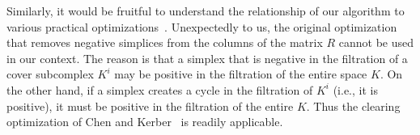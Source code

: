 Similarly, it would be fruitful to understand the relationship of our algorithm
to various practical optimizations~\cite{parallel-phat}.
Unexpectedly to us, the original optimization~\cite{ELZ02} that removes negative
simplices from the columns of the matrix $R$ cannot be used in our context.
The reason is that a simplex that is
negative in the filtration of a cover subcomplex $K^i$ may be positive in the
filtration of the entire space $K$.
On the other hand, if a simplex creates a cycle in the filtration of $K^i$
(i.e., it is positive), it must be positive in the filtration of the entire $K$.
Thus the clearing optimization of Chen and Kerber~\cite{clearing-optimization}
is readily applicable.
